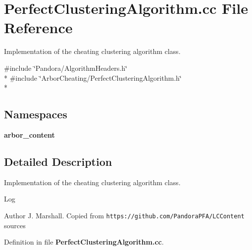 \section{Perfect\+Clustering\+Algorithm.\+cc File Reference}
\label{PerfectClusteringAlgorithm_8cc}


Implementation of the cheating clustering algorithm class.  


{\ttfamily \#include \char`\"{}Pandora/\+Algorithm\+Headers.\+h\char`\"{}}\\*
{\ttfamily \#include \char`\"{}Arbor\+Cheating/\+Perfect\+Clustering\+Algorithm.\+h\char`\"{}}\\*
\subsection*{Namespaces}
\begin{DoxyCompactItemize}
\item 
 {\bf arbor\+\_\+content}
\end{DoxyCompactItemize}


\subsection{Detailed Description}
Implementation of the cheating clustering algorithm class. 

\begin{DoxyParagraph}{Log}

\end{DoxyParagraph}
\begin{DoxyAuthor}{Author}
J. Marshall. Copied from {\tt https\+://github.\+com/\+Pandora\+P\+F\+A/\+L\+C\+Content} sources 
\end{DoxyAuthor}


Definition in file {\bf Perfect\+Clustering\+Algorithm.\+cc}.

